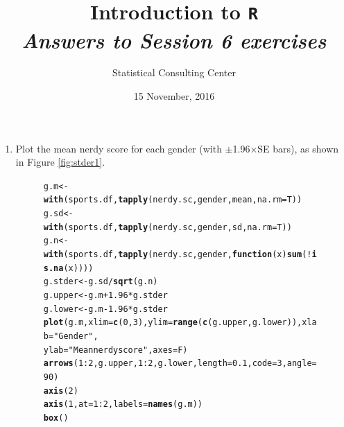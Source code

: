 \documentclass[12pt,a4paper]{article}\usepackage[]{graphicx}\usepackage[]{color}
\makeatletter
\newcommand{\hlnum}[1]{\textcolor[rgb]{0.686,0.059,0.569}{#1}}%
\newcommand{\hlstr}[1]{\textcolor[rgb]{0.192,0.494,0.8}{#1}}%
\newcommand{\hlopt}[1]{\textcolor[rgb]{0,0,0}{#1}}%
\newcommand{\hlstd}[1]{\textcolor[rgb]{0.345,0.345,0.345}{#1}}%
\newcommand{\hlkwa}[1]{\textcolor[rgb]{0.161,0.373,0.58}{\textbf{#1}}}%
\newcommand{\hlkwb}[1]{\textcolor[rgb]{0.69,0.353,0.396}{#1}}%
\newcommand{\hlkwc}[1]{\textcolor[rgb]{0.333,0.667,0.333}{#1}}%
\newcommand{\hlkwd}[1]{\textcolor[rgb]{0.737,0.353,0.396}{\textbf{#1}}}%
\newenvironment{kframe}{%
 \def\at@end@of@kframe{}%
 \ifinner\ifhmode%
  \def\at@end@of@kframe{\end{minipage}}%
  \begin{minipage}{\columnwidth}%
 \fi\fi%
 \def\FrameCommand##1{\hskip\@totalleftmargin \hskip-\fboxsep
 \colorbox{shadecolor}{##1}\hskip-\fboxsep
     \hskip-\linewidth \hskip-\@totalleftmargin \hskip\columnwidth}%
 \MakeFramed {\advance\hsize-\width
   \@totalleftmargin\z@ \linewidth\hsize
   \@setminipage}}%
 {\par\unskip\endMakeFramed%
 \at@end@of@kframe}
\newenvironment{knitrout}{}{} %
\makeatother
\begin{document}
\setlength\parindent{0cm}
\title{\Large{\textbf{Introduction to \texttt{R}}}\\
\textit{Answers to Session 6 exercises}}
\author{Statistical Consulting Center}
\date{15 November, 2016}
\maketitle
 

\begin{enumerate}
\item Plot the mean nerdy score for each gender (with $\pm$1.96$\times$SE bars), as shown in Figure \ref{fig:stder1}. 
\begin{figure}[h]   
 \centering
\begin{knitrout}
\color{fgcolor}\begin{kframe}
\begin{alltt}
\hlstd{g.m} \hlkwb{<-} \hlkwd{with}\hlstd{(sports.df,} \hlkwd{tapply}\hlstd{(nerdy.sc, gender, mean,} \hlkwc{na.rm} \hlstd{= T))}
\hlstd{g.sd} \hlkwb{<-} \hlkwd{with}\hlstd{(sports.df,} \hlkwd{tapply}\hlstd{(nerdy.sc, gender, sd,} \hlkwc{na.rm} \hlstd{= T))}
\hlstd{g.n} \hlkwb{<-} \hlkwd{with}\hlstd{(sports.df,} \hlkwd{tapply}\hlstd{(nerdy.sc, gender,} \hlkwa{function}\hlstd{(}\hlkwc{x}\hlstd{)}\hlkwd{sum}\hlstd{(}\hlopt{!}\hlkwd{is.na}\hlstd{(x))))}
\hlstd{g.stder} \hlkwb{<-} \hlstd{g.sd}\hlopt{/}\hlkwd{sqrt}\hlstd{(g.n)}
\hlstd{g.upper} \hlkwb{<-}\hlstd{g.m} \hlopt{+} \hlnum{1.96}\hlopt{*}\hlstd{g.stder}
\hlstd{g.lower} \hlkwb{<-}\hlstd{g.m} \hlopt{-} \hlnum{1.96}\hlopt{*}\hlstd{g.stder}
\hlkwd{plot}\hlstd{(g.m,} \hlkwc{xlim} \hlstd{=} \hlkwd{c}\hlstd{(}\hlnum{0}\hlstd{,} \hlnum{3}\hlstd{),} \hlkwc{ylim} \hlstd{=} \hlkwd{range}\hlstd{(}\hlkwd{c}\hlstd{(g.upper, g.lower)),} \hlkwc{xlab} \hlstd{=} \hlstr{"Gender"}\hlstd{,}
     \hlkwc{ylab} \hlstd{=} \hlstr{"Mean nerdy score"}\hlstd{,} \hlkwc{axes} \hlstd{= F)}
\hlkwd{arrows}\hlstd{(}\hlnum{1}\hlopt{:}\hlnum{2}\hlstd{, g.upper,} \hlnum{1}\hlopt{:}\hlnum{2}\hlstd{, g.lower,} \hlkwc{length} \hlstd{=} \hlnum{0.1}\hlstd{,} \hlkwc{code} \hlstd{=} \hlnum{3}\hlstd{,} \hlkwc{angle} \hlstd{=} \hlnum{90}\hlstd{)}
\hlkwd{axis}\hlstd{(}\hlnum{2}\hlstd{)}
\hlkwd{axis}\hlstd{(}\hlnum{1}\hlstd{,} \hlkwc{at}\hlstd{=}\hlnum{1}\hlopt{:}\hlnum{2}\hlstd{,} \hlkwc{labels} \hlstd{=} \hlkwd{names}\hlstd{(g.m))}
\hlkwd{box}\hlstd{()}
\end{alltt}
\end{kframe}

\end{knitrout}
\end{figure}
\end{enumerate}
\end{document}
